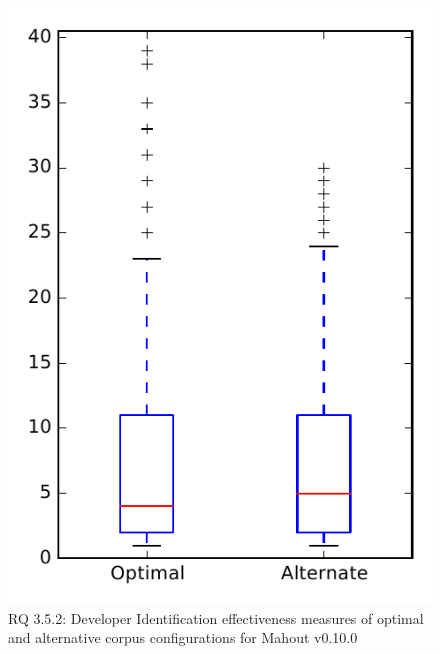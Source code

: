 
\begin{figure}
\centering
\includegraphics[height=0.4\textheight]{figures/combo/dit_rq2_mahout}
\caption{RQ 3.5.2: Developer Identification effectiveness measures of optimal and alternative corpus configurations for Mahout v0.10.0}
\label{fig:combo:dit:rq2:mahout}
\end{figure}
